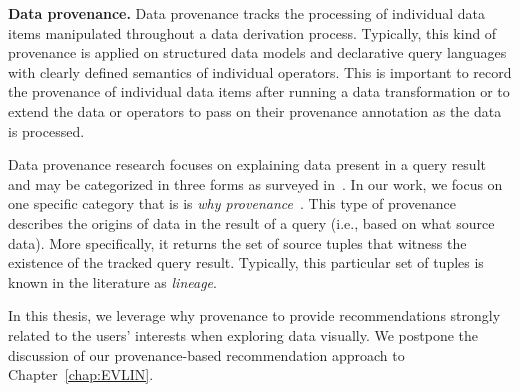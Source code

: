 \smallskip
\noindent \textbf{Data provenance.} 
Data provenance tracks the processing of individual data items manipulated throughout a data derivation process.
Typically, this kind of provenance is applied on structured data models and declarative query languages with clearly defined semantics of individual operators.
This is important to record the provenance of individual data items after running a data transformation or to extend the data or operators to pass on their provenance annotation as the data is processed. 

Data provenance research focuses on explaining data present in a query result and may be categorized in three forms as surveyed in~\cite{Herschel2017survey}.
In our work, we focus on one specific category  that is  is \emph{why provenance}~\cite{buneman:icdt01,cui:vldb01}. 
This type of provenance describes the origins of data in the result of a query (i.e., based on what source data). More specifically, it returns the set of source tuples that witness the existence of the tracked query result. 
Typically, this particular set of tuples is known in the literature as \emph{lineage}. 

In this thesis, we leverage why provenance to provide recommendations strongly related to the users' interests when exploring data visually. We postpone the discussion of our provenance-based recommendation approach to Chapter~\ref{chap:EVLIN}.

